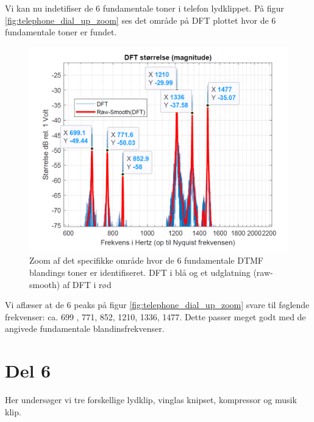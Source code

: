 Vi kan nu indetifiser de 6 fundamentale toner i telefon lydklippet. På figur \autoref{fig:telephone_dial_up_zoom} ses det område på DFT plottet hvor de 6 fundamentale toner er fundet. 

\begin{figure}[H]
\centering
\includegraphics[width=\textwidth]{"figures/opgave5_zoom_1.png"}
\caption{Zoom af det specifikke område hvor de 6 fundamentale DTMF blandings toner er identifiseret. DFT i blå og et udglatning (raw-smooth) af DFT i rød}
\label{fig:telephone_dial_up_zoom}
\end{figure}

Vi aflæser at de 6 peaks på figur \autoref{fig:telephone_dial_up_zoom} svare til føglende frekvenser: ca. 699 , 771, 852, 1210, 1336, 1477. 
Dette passer meget godt med de angivede fundamentale blandinsfrekvenser. 

\section{Del 6}

Her undersøger vi tre forskellige lydklip, vinglas knipset, kompressor og musik klip. 

